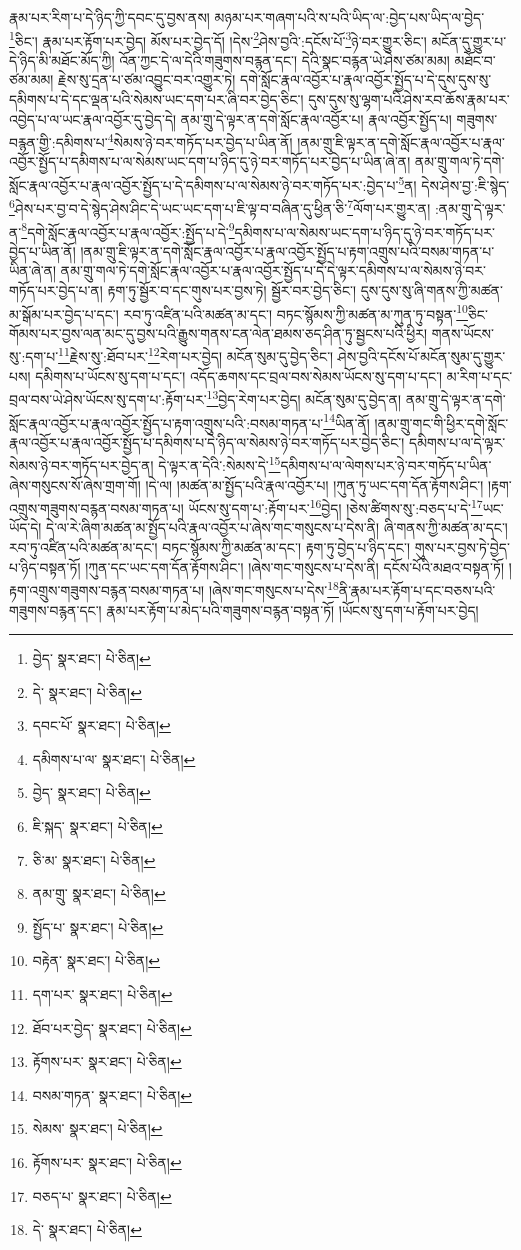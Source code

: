 རྣམ་པར་རིག་པ་དེ་ཉིད་ཀྱི་དབང་དུ་བྱས་ནས། མཉམ་པར་གཞག་པའི་ས་པའི་ཡིད་ལ་:བྱེད་པས་ཡིད་ལ་བྱེད་\footnote{བྱེད་  སྣར་ཐང་།  པེ་ཅིན། }ཅིང་། རྣམ་པར་རྟོག་པར་བྱེད། མོས་པར་བྱེད་དོ། །དེས་\footnote{དེ་  སྣར་ཐང་།  པེ་ཅིན། }ཤེས་བྱའི་:དངོས་པོ་\footnote{དབང་པོ་  སྣར་ཐང་།  པེ་ཅིན། }ཉེ་བར་གྱུར་ཅིང་། མངོན་དུ་གྱུར་པ་དེ་ཉིད་མི་མཐོང་མོད་ཀྱི། འོན་ཀྱང་དེ་ལ་དེའི་གཟུགས་བརྙན་དང་། དེའི་སྣང་བརྙན་ཡེ་ཤེས་ཙམ་མམ། མཐོང་བ་ཙམ་མམ། རྗེས་སུ་དྲན་པ་ཙམ་འབྱུང་བར་འགྱུར་ཏེ། དགེ་སློང་རྣལ་འབྱོར་པ་རྣལ་འབྱོར་སྤྱོད་པ་དེ་དུས་དུས་སུ་དམིགས་པ་དེ་དང་ལྡན་པའི་སེམས་ཡང་དག་པར་ཞི་བར་བྱེད་ཅིང་། དུས་དུས་སུ་ལྷག་པའི་ཤེས་རབ་ཆོས་རྣམ་པར་འབྱེད་པ་ལ་ཡང་རྣལ་འབྱོར་དུ་བྱེད་དེ། ནམ་གྲུ་དེ་ལྟར་ན་དགེ་སློང་རྣལ་འབྱོར་པ། རྣལ་འབྱོར་སྤྱོད་པ། གཟུགས་བརྙན་གྱི་:དམིགས་པ་\footnote{དམིགས་པ་ལ་  སྣར་ཐང་།  པེ་ཅིན། }སེམས་ཉེ་བར་གཏོད་པར་བྱེད་པ་ཡིན་ནོ། །ནམ་གྲུ་ཇི་ལྟར་ན་དགེ་སློང་རྣལ་འབྱོར་པ་རྣལ་འབྱོར་སྤྱོད་པ་དམིགས་པ་ལ་སེམས་ཡང་དག་པ་ཉིད་དུ་ཉེ་བར་གཏོད་པར་བྱེད་པ་ཡིན་ཞེ་ན། ནམ་གྲུ་གལ་ཏེ་དགེ་སློང་རྣལ་འབྱོར་པ་རྣལ་འབྱོར་སྤྱོད་པ་དེ་དམིགས་པ་ལ་སེམས་ཉེ་བར་གཏོད་པར་:བྱེད་པ་\footnote{བྱེད་  སྣར་ཐང་།  པེ་ཅིན། }ན། དེས་ཤེས་བྱ་:ཇི་སྙེད་\footnote{ཇི་སྐད་  སྣར་ཐང་།  པེ་ཅིན། }ཤེས་པར་བྱ་བ་དེ་སྙེད་ཤེས་ཤིང་དེ་ཡང་ཡང་དག་པ་ཇི་ལྟ་བ་བཞིན་དུ་ཕྱིན་ཅི་\footnote{ཅི་མ་  སྣར་ཐང་།  པེ་ཅིན། }ལོག་པར་གྱུར་ན། :ནམ་གྲུ་དེ་ལྟར་ན་\footnote{ནམ་གྲུ་  སྣར་ཐང་།  པེ་ཅིན། }དགེ་སློང་རྣལ་འབྱོར་པ་རྣལ་འབྱོར་:སྤྱོད་པ་དེ་\footnote{སྤྱོད་པ་  སྣར་ཐང་།  པེ་ཅིན། }དམིགས་པ་ལ་སེམས་ཡང་དག་པ་ཉིད་དུ་ཉེ་བར་གཏོད་པར་བྱེད་པ་ཡིན་ནོ། །ནམ་གྲུ་ཇི་ལྟར་ན་དགེ་སློང་རྣལ་འབྱོར་པ་རྣལ་འབྱོར་སྤྱོད་པ་རྟག་འགྲུས་པའི་བསམ་གཏན་པ་ཡིན་ཞེ་ན། ནམ་གྲུ་གལ་ཏེ་དགེ་སློང་རྣལ་འབྱོར་པ་རྣལ་འབྱོར་སྤྱོད་པ་དེ་དེ་ལྟར་དམིགས་པ་ལ་སེམས་ཉེ་བར་གཏོད་པར་བྱེད་པ་ན། རྟག་ཏུ་སྦྱོར་བ་དང་གུས་པར་བྱས་ཏེ། སྦྱོར་བར་བྱེད་ཅིང་། དུས་དུས་སུ་ཞི་གནས་ཀྱི་མཚན་མ་སྒོམ་པར་བྱེད་པ་དང་། རབ་ཏུ་འཛིན་པའི་མཚན་མ་དང་། བཏང་སྙོམས་ཀྱི་མཚན་མ་ཀུན་ཏུ་བསྟན་\footnote{བརྟེན་  སྣར་ཐང་།  པེ་ཅིན། }ཅིང་གོམས་པར་བྱས་ལན་མང་དུ་བྱས་པའི་རྒྱུས་གནས་ངན་ལེན་ཐམས་ཅད་ཤིན་ཏུ་སྦྱངས་པའི་ཕྱིར། གནས་ཡོངས་སུ་:དག་པ་\footnote{དག་པར་  སྣར་ཐང་།  པེ་ཅིན། }རྗེས་སུ་:ཐོབ་པར་\footnote{ཐོབ་པར་བྱེད་  སྣར་ཐང་།  པེ་ཅིན། }རེག་པར་བྱེད། མངོན་སུམ་དུ་བྱེད་ཅིང་། ཤེས་བྱའི་དངོས་པོ་མངོན་སུམ་དུ་གྱུར་པས། དམིགས་པ་ཡོངས་སུ་དག་པ་དང་། འདོད་ཆགས་དང་བྲལ་བས་སེམས་ཡོངས་སུ་དག་པ་དང་། མ་རིག་པ་དང་བྲལ་བས་ཡེ་ཤེས་ཡོངས་སུ་དག་པ་:རྟོག་པར་\footnote{རྟོགས་པར་  སྣར་ཐང་།  པེ་ཅིན། }བྱེད་རེག་པར་བྱེད། མངོན་སུམ་དུ་བྱེད་ན། ནམ་གྲུ་དེ་ལྟར་ན་དགེ་སློང་རྣལ་འབྱོར་པ་རྣལ་འབྱོར་སྤྱོད་པ་རྟག་འགྲུས་པའི་:བསམ་གཏན་པ་\footnote{བསམ་གཏན་  སྣར་ཐང་།  པེ་ཅིན། }ཡིན་ནོ། །ནམ་གྲུ་གང་གི་ཕྱིར་དགེ་སློང་རྣལ་འབྱོར་པ་རྣལ་འབྱོར་སྤྱོད་པ་དམིགས་པ་དེ་ཉིད་ལ་སེམས་ཉེ་བར་གཏོད་པར་བྱེད་ཅིང་། དམིགས་པ་ལ་དེ་ལྟར་སེམས་ཉེ་བར་གཏོད་པར་བྱེད་ན། དེ་ལྟར་ན་དེའི་:སེམས་དེ་\footnote{སེམས་  སྣར་ཐང་།  པེ་ཅིན། }དམིགས་པ་ལ་ལེགས་པར་ཉེ་བར་གཏོད་པ་ཡིན་ཞེས་གསུངས་སོ་ཞེས་གྲག་གོ། །དེ་ལ། །མཚན་མ་སྤྱོད་པའི་རྣལ་འབྱོར་པ། །ཀུན་ཏུ་ཡང་དག་དོན་རྟོགས་ཤིང་། །རྟག་འགྲུས་གཟུགས་བརྙན་བསམ་གཏན་པ། ཡོངས་སུ་དག་པ་:རྟོག་པར་\footnote{རྟོགས་པར་  སྣར་ཐང་།  པེ་ཅིན། }བྱེད། །ཅེས་ཚིགས་སུ་:བཅད་པ་དེ་\footnote{བཅད་པ་  སྣར་ཐང་།  པེ་ཅིན། }ཡང་ཡོད་དེ། དེ་ལ་རེ་ཞིག་མཚན་མ་སྤྱོད་པའི་རྣལ་འབྱོར་པ་ཞེས་གང་གསུངས་པ་དེས་ནི། ཞི་གནས་ཀྱི་མཚན་མ་དང་། རབ་ཏུ་འཛིན་པའི་མཚན་མ་དང་། བཏང་སྙོམས་ཀྱི་མཚན་མ་དང་། རྟག་ཏུ་བྱེད་པ་ཉིད་དང་། གུས་པར་བྱས་ཏེ་བྱེད་པ་ཉིད་བསྟན་ཏོ། །ཀུན་དང་ཡང་དག་དོན་རྟོགས་ཤིང་། །ཞེས་གང་གསུངས་པ་དེས་ནི། དངོས་པོའི་མཐའ་བསྟན་ཏོ། །རྟག་འགྲུས་གཟུགས་བརྙན་བསམ་གཏན་པ། །ཞེས་གང་གསུངས་པ་དེས་\footnote{དེ་  སྣར་ཐང་།  པེ་ཅིན། }ནི་རྣམ་པར་རྟོག་པ་དང་བཅས་པའི་གཟུགས་བརྙན་དང་། རྣམ་པར་རྟོག་པ་མེད་པའི་གཟུགས་བརྙན་བསྟན་ཏོ། །ཡོངས་སུ་དག་པ་རྟོག་པར་བྱེད། 